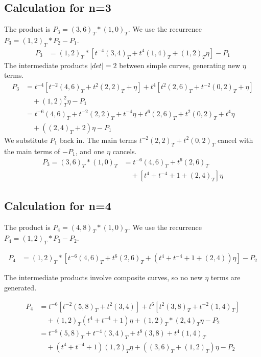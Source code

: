 \documentclass[12pt]{article}
\begin{document}
\subsection*{Calculation for n=3}
The product is $P_3 = (3,6)_T \ast (1,0)_T$. We use the recurrence $P_3 = (1,2)_T \ast P_2 - P_1$.
\begin{align}
P_3 &= (1,2)_T \ast [t^{-4}(3,4)_T + t^{4}(1,4)_T + (1,2)_T\eta] - P_1
\end{align}
The intermediate products $|det|=2$ between simple curves, generating new $\eta$ terms.
\begin{align}
P_3 &= t^{-4}[t^{-2}(4,6)_T+t^{2}(2,2)_T+\eta] + t^{4}[t^{2}(2,6)_T+t^{-2}(0,2)_T+\eta] \\
&\quad + (1,2)_T^2\eta - P_1 \\[0.5em]
&= t^{-6}(4,6)_T+t^{-2}(2,2)_T+t^{-4}\eta + t^{6}(2,6)_T+t^{2}(0,2)_T+t^{4}\eta \\
&\quad + ((2,4)_T+2)\eta - P_1
\end{align}
We substitute $P_1$ back in. The main terms $t^{-2}(2,2)_T+t^{2}(0,2)_T$ cancel with the main terms of $-P_1$, and one $\eta$ cancels.
\begin{align}
P_3 = (3,6)_T \ast (1,0)_T &= t^{-6}(4,6)_T + t^{6}(2,6)_T \\
&\quad + [ t^4 + t^{-4} + 1 + (2,4)_T ]\eta
\end{align}


\subsection*{Calculation for n=4}

The product is $P_4 = (4,8)_T \ast (1,0)_T$. We use the recurrence $P_4 = (1,2)_T \ast P_3 - P_2$.

\begin{align}
P_4 &= (1,2)_T \ast [t^{-6}(4,6)_T + t^{6}(2,6)_T + (t^4 + t^{-4} + 1 + (2,4))\eta] - P_2
\end{align}

The intermediate products involve composite curves, so no new $\eta$ terms are generated.

\begin{align}
P_4 &= t^{-6}[t^{-2}(5,8)_T+t^{2}(3,4)] + t^{6}[t^{2}(3,8)_T+t^{-2}(1,4)_T] \\
&\quad + (1,2)_T(t^4+t^{-4}+1)\eta + (1,2)_T \ast (2,4)_T\eta - P_2 \\[0.5em]
&= t^{-8}(5,8)_T+t^{-4}(3,4)_T + t^{8}(3,8)+t^{4}(1,4)_T \\
&\quad + (t^4+t^{-4}+1)(1,2)_T\eta + ((3,6)_T+(1,2)_T)\eta - P_2
\end{align}
\end{document}
